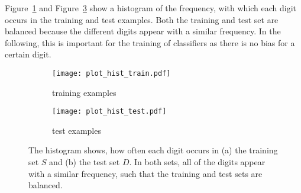 Figure~\ref{fig:plot_hist_train} and Figure~\ref{fig:plot_hist_test} show a histogram of the frequency, with which each digit occurs in the training and test examples. Both the training and test set are balanced because the different digits appear with a similar frequency. In the following, this is important for the training of classifiers as there is no bias for a certain digit. 
\begin{figure}[h!]
    \begin{subfigure}[t]{0.5\textwidth}
        \centering
        \texttt{[image: plot\_hist\_train.pdf]} 
        \caption{training examples} \label{fig:plot_hist_train}
    \end{subfigure}
    \hfill
    \begin{subfigure}[t]{0.5\textwidth}
        \centering
        \texttt{[image: plot\_hist\_test.pdf]} 
        \caption{test examples} \label{fig:plot_hist_test}
    \end{subfigure}
    \caption{The histogram shows, how often each digit occurs in (a) the training set $S$ and (b) the test set $D$. In both sets, all of the digits appear with a similar frequency, such that the training and test sets are balanced.}
\end{figure}


